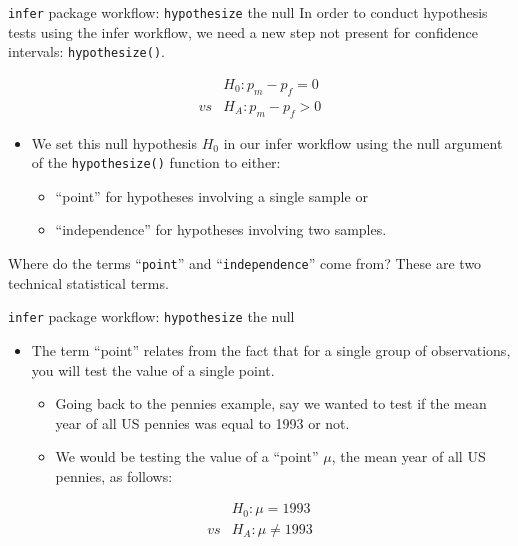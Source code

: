 \documentclass[
  ignorenonframetext,
]{beamer}
\providecommand{\tightlist}{%
  \setlength{\itemsep}{0pt}\setlength{\parskip}{0pt}}
\begin{document}
\begin{frame}[fragile]{\texttt{infer} package workflow:
\texttt{hypothesize} the null}
\protect\hypertarget{infer-package-workflow-hypothesize-the-null}{}
In order to conduct hypothesis tests using the infer workflow, we need a
new step not present for confidence intervals: \texttt{hypothesize()}.

\[\begin{array}{ll}
&H_0: p_m-p_f=0\\
vs&H_A: p_m-p_f>0
\end{array}\]

\begin{itemize}
\item
  We set this null hypothesis \(H_0\) in our infer workflow using the
  null argument of the \texttt{hypothesize()} function to either:

  \begin{itemize}
  \tightlist
  \item
    ``point'' for hypotheses involving a single sample or
  \item
    ``independence'' for hypotheses involving two samples.
  \end{itemize}
\end{itemize}

Where do the terms ``\texttt{point}'' and ``\texttt{independence}'' come
from? These are two technical statistical terms.
\end{frame}

\begin{frame}{\texttt{infer} package workflow: \texttt{hypothesize} the
null}
\protect\hypertarget{infer-package-workflow-hypothesize-the-null-1}{}
\begin{itemize}
\item
  The term ``point'' relates from the fact that for a single group of
  observations, you will test the value of a single point.

  \begin{itemize}
  \tightlist
  \item
    Going back to the pennies example, say we wanted to test if the mean
    year of all US pennies was equal to 1993 or not.
  \item
    We would be testing the value of a ``point'' \(\mu\), the mean year
    of all US pennies, as follows:
  \end{itemize}
\end{itemize}

\[\begin{array}{ll}
&H_0: \mu=1993\\
vs&H_A: \mu\neq 1993
\end{array}\]
\end{frame}
\end{document}
